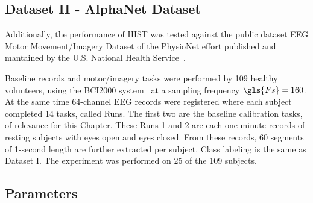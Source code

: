       
\subsection{Dataset II - AlphaNet Dataset}
Additionally, the performance of HIST was tested against the public dataset EEG Motor Movement/Imagery Dataset of the PhysioNet effort published and mantained by the U.S. National Health Service~\cite{Schalk2004,Goldberger2000}.  

Baseline records and motor/imagery tasks were performed by 109 healthy volunteers, using the BCI2000 system~\cite{Schalk2004} at a sampling frequency $\gls{Fs} = 160$.  At the same time 64-channel EEG records were registered where each subject completed 14 tasks, called Runs.  The first two are the baseline calibration tasks, of relevance for this Chapter.  These Runs 1 and 2 are each one-minute records of resting subjects with eyes open and eyes closed.  From these records, 60 segments of 1-second length are further extracted per subject. Class labeling is the same as Dataset I.  The experiment was performed on 25 of the 109 subjects.


%
%


\subsection{Parameters}

